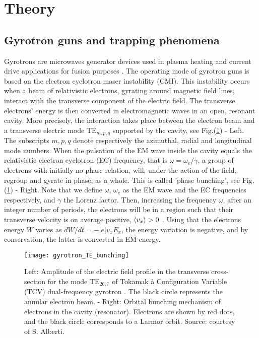 \section{Theory}\label{Theory}
\subsection{Gyrotron guns and trapping phenomena}\label{Section_gyrotron}


Gyrotrons are microwaves generator devices used in plasma heating and current drive applications for fusion purposes \cite{Pagonakis}. The operating mode of gyrotron guns is based on the electron cyclotron maser instability (CMI). This instability occurs when a beam of relativistic electrons, gyrating around magnetic field lines, interact with the transverse component of the electric field. The transverse electrons' energy is then converted in electromagnetic waves in an open, resonant cavity. More precisely, the interaction takes place between the electron beam and a transverse electric mode TE$_{m,p,q}$ supported by the cavity, see Fig.(\ref{modes}) - Left. The subscripts $m,p,q$ denote respectively the azimuthal, radial and longitudinal mode numbers. When the pulsation of the EM wave inside the cavity equals the relativistic electron cyclotron (EC) frequency, that is $\omega = \omega_e/\gamma$, a group of electrons with initially no phase relation, will, under the action of the field, regroup and gyrate in phase, as a whole. This is called 'phase bunching', see Fig.(\ref{modes}) - Right. Note that we define $\omega$, $\omega_e$ as the EM wave and the EC frequencies respectively, and $\gamma$ the Lorenz factor.  Then, increasing the frequency $\omega$, after an integer number of periods, the electrons will be in a region such that their transverse velocity is on average positive, $\braket{v_x} > 0$ \cite{AlbertiThesis}. Using that the electrons energy $W$ varies as $dW/dt = -|e|v_xE_x$, the energy variation is negative, and by conservation, the latter is converted in EM energy.\\

\begin{figure}[h!]
\centering
	\texttt{[image: gyrotron\_TE\_bunching]}
	\caption{\label{modes}Left: Amplitude of the electric field profile in the transverse cross-section for the mode TE$_{26,7}$ of Tokamak à Configuration Variable (TCV) dual-frequency gyrotron  \cite{GenoudThesis}. The black circle represents the annular electron beam. - Right:  Orbital bunching mechanism of electrons in the cavity (resonator). Electrons are shown by red dots, and the black circle corresponds to a Larmor orbit. Source: courtesy of S. Alberti.}
\end{figure}  

